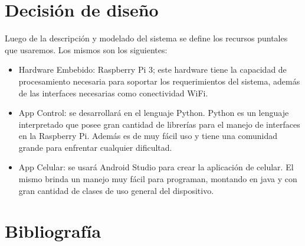 \documentclass[16pt, article,notitlepage]{article}
\begin{document}
\section{Decisión de diseño}
Luego de la descripción y modelado del sistema se define los recursos puntales que usaremos. Los mismos son los siguientes:

\begin{itemize}
        \item   Hardware Embebido: Raspberry Pi 3; este hardware tiene la capacidad de procesamiento necesaria para soportar los requerimientos del sistema, además de las interfaces necesarias como conectividad WiFi.
        \item App Control: se desarrollará en el lenguaje Python. Python es un lenguaje interpretado que posee gran cantidad de librerías para el manejo de interfaces en la Raspberry Pi. Además es de muy fácil uso y tiene una comunidad grande para enfrentar cualquier dificultad.
        \item   App Celular: se usará Android Studio para crear la aplicación de celular. El mismo brinda un manejo muy fácil para programan, montando en java y con gran cantidad de clases de uso general del dispositivo.

    \end{itemize}
    
\section{Bibliografía}



\end{document}
